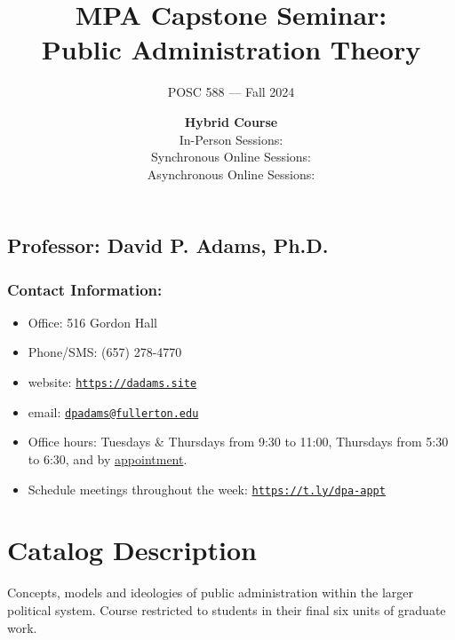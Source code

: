 \documentclass[12pt, letterpaper]{article}
\begin{document}
\title{MPA Capstone Seminar: \\ Public Administration Theory}


\author{POSC 588 — Fall 2024}
\date{\textbf{Hybrid Course} \\ 
\vspace*{0.5em}
In-Person Sessions: \\ 
\vspace{0.5em}
Synchronous Online Sessions: \\
\vspace{0.5em}
Asynchronous Online Sessions:
}

    \maketitle


    \subsection*{Professor: David P. Adams, Ph.D.}

    \subsubsection*{Contact Information:}
    
    \begin{itemize}
        \item Office: 516 Gordon Hall
        \item Phone/SMS: (657) 278-4770
        \item website: \href{https://dadams.site}{\texttt{https://dadams.site}}
        \item email: \href{dpadams@fullerton.edu}{\texttt{dpadams@fullerton.edu}}
        \item Office hours: Tuesdays \& Thursdays from 9:30 to 11:00, Thursdays from 5:30 to 6:30, and by \href{https://t.ly/dpa-appt}{appointment}.
        \item Schedule meetings throughout the week: \href{https://t.ly/dpa-appt}{\texttt{https://t.ly/dpa-appt}}
    \end{itemize}
    
    \section{Catalog Description}
    Concepts, models and ideologies of public administration within the larger political system. Course restricted to students in their final six units of graduate work.
    
\end{document}
